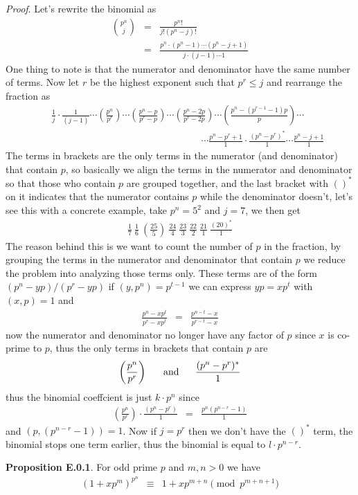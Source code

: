 \documentclass[aps,preprint,preprintnumbers,nofootinbib,showpacs,prd]{revtex4-1}
\newcommand{\nbea}{\begin{eqnarray*}}
\newcommand{\neea}{\end{eqnarray*}}
\begin{document}
{\it Proof}. Let's rewrite the binomial as
%
\nbea
\binom{p^n}{j} & = & \frac{p^n!}{j!(p^n - j)!} \\
& = & \frac{p^n\cdot(p^n-1)\cdots (p^n - j + 1)}{j\cdot(j-1)\cdots 1}
\neea
%
One thing to note is that the numerator and denominator have the same number of terms. Now let $r$ be the highest exponent such that $p^r \le j$ and rearrange the fraction as
%
\nbea
&&\frac{1}{j} \cdot \frac{1}{(j-1)} \cdots \left(\frac{p^n}{p^r}\right) \cdots \left(\frac{p^{n}-p}{p^{r}-p}\right) \cdots \left(\frac{p^{n}-2p}{p^{r}-2p}\right) \cdots \left(\frac{p^{n}-(p^{r-1} - 1)p}{p}\right) \cdots \\
&& ~~~~~~~~~~~~~~~~~~~~~~~~~~~~~~~~~~~~~~~~~~~~~~~~~~~~~~~~~~~~~~~~~~~~~~ \cdots \frac{p^{n}-p^{r} + 1}{1} \cdot \frac{(p^{n}-p^{r})^*}{1} \cdots \frac{p^{n} - j + 1}{1}
\neea
%
The terms in brackets are the only terms in the numerator (and denominator) that contain $p$, so basically we align the terms in the numerator and denominator so that those who contain $p$ are grouped together, and the last bracket with $()^*$ on it indicates that the numerator contains $p$ while the denominator doesn't, let's see this with a concrete example, take $p^n = 5^2$ and $j = 7$, we then get
%
\nbea
\frac{1}{7}~\frac{1}{6}~\left(\frac{25}{5}\right)~\frac{24}{4}~\frac{23}{3}~\frac{22}{2}~\frac{21}{1}~\frac{(20)^*}{1}
\neea
%
The reason behind this is we want to count the number of $p$ in the fraction, by grouping the terms in the numerator and denominator that contain $p$ we reduce the problem into analyzing those terms only. These terms are of the form $(p^n - yp)/(p^r - yp)$ if $(y,p^n) = p^{t-1}$ we can express $yp = xp^t$ with $(x,p) = 1$ and 
%
\nbea
\frac{p^n - xp^t}{p^r - xp^t} & = & \frac{p^{n-t} - x}{p^{r-t} - x}
\neea
%
now the numerator and denominator no longer have any factor of $p$ since $x$ is co-prime to $p$, thus the only terms in brackets that contain $p$ are
%
\nbea
\left(\frac{p^n}{p^r}\right) ~~~~~{\rm and} ~~~~~ \frac{(p^{n}-p^{r})^*}{1}
\neea
%
thus the binomial coeffcient is just $k\cdot p^n$ since
%
\nbea
\left(\frac{p^n}{p^r}\right) \cdot \frac{(p^{n}-p^{r})}{1} & = & \frac{p^n (p^{n-r}-1)}{1}
\neea
%
and $(p, (p^{n-r}-1)) = 1$. Now if $j = p^r$ then we don't have the $()^*$ term, the binomial stops one term earlier, thus the binomial is equal to $l\cdot p^{n-r}$.

{\bf Proposition E.0.1}. For odd prime $p$ and $m,n > 0$ we have
%
\nbea
(1 + xp^m)^{p^n} & \equiv & 1 + xp^{m+n} \pmod{p^{m+n+1}}
\neea
%
\end{document}
